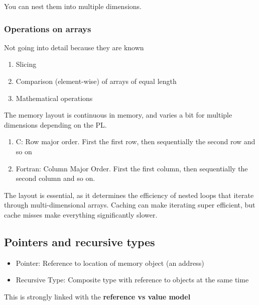 \documentclass{article}
\begin{document}
You can nest them into multiple dimensions. 
\subsubsection{Operations on arrays}
Not going into detail because they are known
\begin{enumerate}
  \item Slicing
  \item Comparison (element-wise) of arrays of equal length
  \item Mathematical operations
\end{enumerate}

The memory layout is continuous in memory, and varies a bit for multiple dimensions depending on the PL.

\begin{enumerate}
  \item C: Row major order. First the first row, then sequentially the second row and so on
  \item Fortran: Column Major Order. First the first column, then sequentially the second column and so on.
\end{enumerate}

The layout is essential, as it determines the efficiency of nested loops that iterate through multi-dimensional arrays. Caching can make iterating super efficient, but cache misses make everything significantly slower.

\subsection{Pointers and recursive types}
\begin{itemize}
  \item Pointer: Reference to location of memory object (an address)
  \item Recursive Type: Composite type with reference to objects at the same time 
\end{itemize}

This is strongly linked with the \textbf{reference vs value model}
\end{document}
